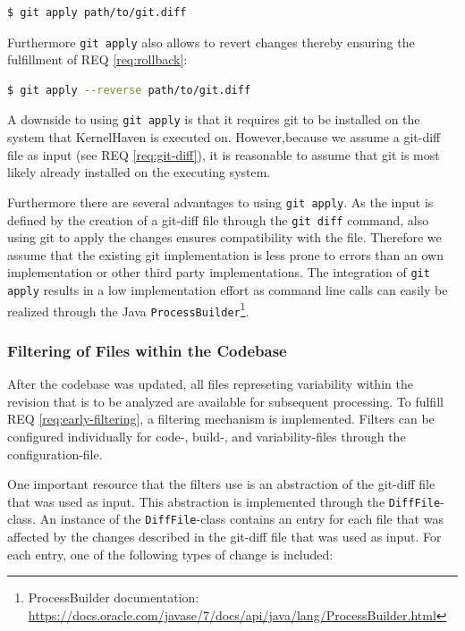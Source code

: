 \documentclass[a4paper]{article}
\begin{document}
\begin{lstlisting}[language=bash]
  $ git apply path/to/git.diff
\end{lstlisting}

 Furthermore \texttt{git apply} also allows to revert changes thereby ensuring the fulfillment of REQ \ref{req:rollback}:
 \begin{lstlisting}[language=bash]
  $ git apply --reverse path/to/git.diff
\end{lstlisting}
 
 A downside to using \texttt{git apply} is that it requires git to be installed on the system that KernelHaven is executed on. However,because we assume a git-diff file as input (see REQ \ref{req:git-diff}), it is reasonable to assume that git is most likely already installed on the executing system.

Furthermore there are several advantages to using \texttt{git apply}. As the input is defined by the creation of a git-diff file through the \texttt{git diff} command, also using git to apply the changes ensures compatibility with the file. Therefore we assume that the existing git implementation is less prone to errors than an own implementation or other third party implementations. The integration of \texttt{git apply} results in a low implementation effort as command line calls can easily be realized through the Java \texttt{ProcessBuilder}\footnote{ProcessBuilder documentation: \url{https://docs.oracle.com/javase/7/docs/api/java/lang/ProcessBuilder.html}}.

\subsubsection{Filtering of Files within the Codebase}\label{filtering-input}

After the codebase was updated, all files represeting variability within the revision that is to be analyzed are available for subsequent processing. To fulfill REQ \ref{req:early-filtering}, a filtering mechanism is implemented. Filters can be configured individually for code-, build-, and variability-files through the configuration-file.

One important resource that the filters use is an abstraction of the git-diff file that was used as input. This abstraction is implemented through the \texttt{DiffFile}-class.
An instance of the \texttt{DiffFile}-class contains an entry for each file that was affected by the changes described in the git-diff file that was used as input. For each entry, one of the following types of change is included:
\end{document}
